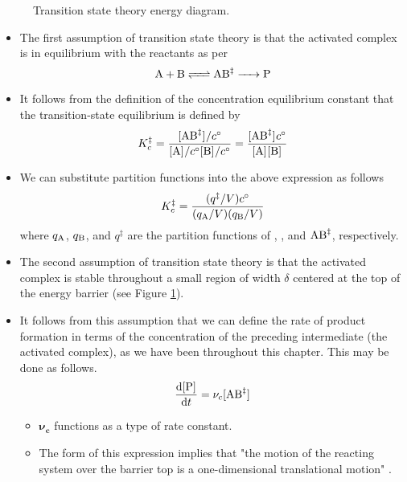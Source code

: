 \documentclass[../notes.tex]{subfiles}
\begin{document}
\begin{itemize}
\begin{figure}[h!]
        \caption{Transition state theory energy diagram.}
        \label{fig:TST}
    \end{figure}
    \begin{itemize}
        \item The first assumption of transition state theory is that the activated complex is in equilibrium with the reactants as per
        \begin{equation*}
            \ce{A + B <=> AB${}^\ddagger$ -> P}
        \end{equation*}
        \item It follows from the definition of the concentration equilibrium constant that the transition-state equilibrium is defined by
        \begin{equation*}
            K_c^\ddagger = \frac{\cnc{AB^\ddagger}/c^\circ}{\cnc{A}/c^\circ\cnc{B}/c^\circ}
            = \frac{\cnc{AB^\ddagger}c^\circ}{\cnc{A}\cnc{B}}
        \end{equation*}
        \item We can substitute partition functions into the above expression as follows
        \begin{equation*}
            K_c^\ddagger = \frac{(q^\ddagger/V)c^\circ}{(q_{\ce{A}}/V)(q_{\ce{B}}/V)}
        \end{equation*}
        where $q_{\ce{A}}$, $q_{\ce{B}}$, and $q^\ddagger$ are the partition functions of , , and $\ce{AB^\ddagger}$, respectively.
        \item The second assumption of transition state theory is that the activated complex is stable throughout a small region of width $\delta$ centered at the top of the energy barrier (see Figure \ref{fig:TST}).
        \item It follows from this assumption that we can define the rate of product formation in terms of the concentration of the preceding intermediate (the activated complex), as we have been throughout this chapter. This may be done as follows.
        \begin{equation*}
            \dv{\cnc{P}}{t} = \nu_c\cnc{AB^\ddagger}
        \end{equation*}
        \begin{itemize}
            \item $\bm{\nu_c}$ functions as a type of rate constant.
            \item The form of this expression implies that "the motion of the reacting system over the barrier top is a one-dimensional translational motion" \parencite[1166]{bib:McQuarrieSimon}.

\end{itemize}
\end{itemize}
\end{itemize}
\end{document}
